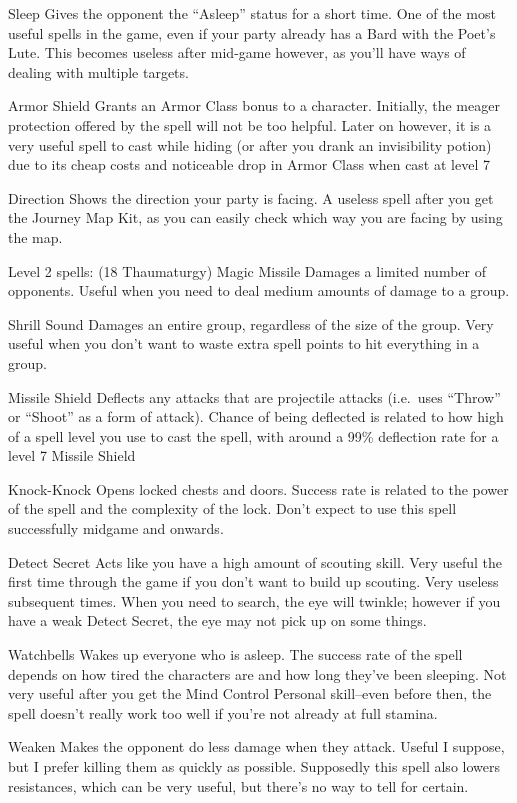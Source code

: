\documentclass[12pt]{article}
\begin{document}
Sleep Gives the opponent the ``Asleep'' status for a short time. One of
the most useful spells in the game, even if your party already has a
Bard with the Poet's Lute. This becomes useless after mid-game however,
as you'll have ways of dealing with multiple targets.

Armor Shield Grants an Armor Class bonus to a character. Initially, the
meager protection offered by the spell will not be too helpful. Later on
however, it is a very useful spell to cast while hiding (or after you
drank an invisibility potion) due to its cheap costs and noticeable drop
in Armor Class when cast at level 7

Direction Shows the direction your party is facing. A useless spell
after you get the Journey Map Kit, as you can easily check which way you
are facing by using the map.

Level 2 spells: (18 Thaumaturgy) Magic Missile Damages a limited number
of opponents. Useful when you need to deal medium amounts of damage to a
group.

Shrill Sound Damages an entire group, regardless of the size of the
group. Very useful when you don't want to waste extra spell points to
hit everything in a group.

Missile Shield Deflects any attacks that are projectile attacks
(i.e.~uses ``Throw'' or ``Shoot'' as a form of attack). Chance of being
deflected is related to how high of a spell level you use to cast the
spell, with around a 99\% deflection rate for a level 7 Missile Shield

Knock-Knock Opens locked chests and doors. Success rate is related to
the power of the spell and the complexity of the lock. Don't expect to
use this spell successfully midgame and onwards.

Detect Secret Acts like you have a high amount of scouting skill. Very
useful the first time through the game if you don't want to build up
scouting. Very useless subsequent times. When you need to search, the
eye will twinkle; however if you have a weak Detect Secret, the eye may
not pick up on some things.

Watchbells Wakes up everyone who is asleep. The success rate of the
spell depends on how tired the characters are and how long they've been
sleeping. Not very useful after you get the Mind Control Personal
skill--even before then, the spell doesn't really work too well if
you're not already at full stamina.

Weaken Makes the opponent do less damage when they attack. Useful I
suppose, but I prefer killing them as quickly as possible. Supposedly
this spell also lowers resistances, which can be very useful, but
there's no way to tell for certain.
\end{document}
